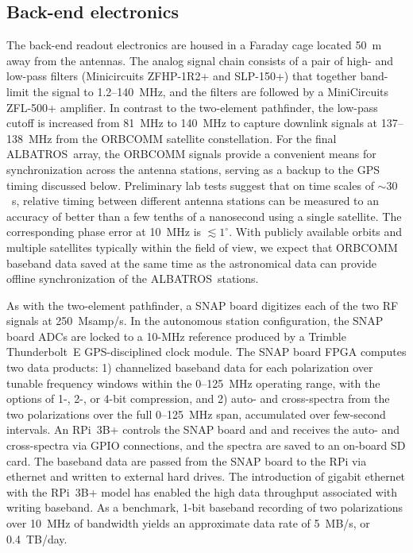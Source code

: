 \documentclass{ws-jai}
\def\albatros{ALBATROS}
\begin{document}

\subsection{Back-end electronics}\label{s:autonomous_backend}

The back-end readout electronics are housed in a Faraday cage located
50~m away from the antennas. The analog signal chain consists of a
pair of high- and low-pass filters (Minicircuits ZFHP-1R2+ and
SLP-150+) that together band-limit the signal to 1.2--140~MHz, and the
filters are followed by a MiniCircuits ZFL-500+ amplifier.  In
contrast to the two-element pathfinder, the low-pass cutoff is
increased from 81~MHz to 140~MHz to capture downlink signals at
137--138~MHz from the ORBCOMM satellite constellation.  For the final
\albatros\ array, the ORBCOMM signals provide a convenient means for
synchronization across the antenna stations, serving as a backup to
the GPS timing discussed below.  Preliminary lab tests suggest that on
time scales of $\sim30$~s, relative timing between different antenna
stations can be measured to an accuracy of better than a few tenths of
a nanosecond using a single satellite.  The corresponding phase error
at 10~MHz is $\lesssim1^\circ$.  With publicly available orbits and
multiple satellites typically within the field of view, we expect that
ORBCOMM baseband data saved at the same time as the astronomical data
can provide offline synchronization of the \albatros\ stations.

As with the two-element pathfinder, a SNAP board digitizes each of the
two RF signals at 250~Msamp/s. In the autonomous station
configuration, the SNAP board ADCs are locked to a 10-MHz reference
produced by a Trimble Thunderbolt~E GPS-disciplined clock module.  The
SNAP board FPGA computes two data products: 1) channelized baseband
data for each polarization over tunable frequency windows within the
0--125~MHz operating range, with the options of 1-, 2-, or 4-bit
compression, and 2) auto- and cross-spectra from the two polarizations
over the full 0--125~MHz span, accumulated over few-second intervals.
An RPi~3B+ controls the SNAP board and and receives the auto- and
cross-spectra via GPIO connections, and the spectra are saved to an
on-board SD card.  The baseband data are passed from the SNAP board to
the RPi via ethernet and written to external hard drives.  The
introduction of gigabit ethernet with the RPi~3B+ model has enabled
the high data throughput associated with writing baseband.  As a
benchmark, 1-bit baseband recording of two polarizations over 10~MHz
of bandwidth yields an approximate data rate of 5~MB/s, or 0.4~TB/day.
\end{document}
